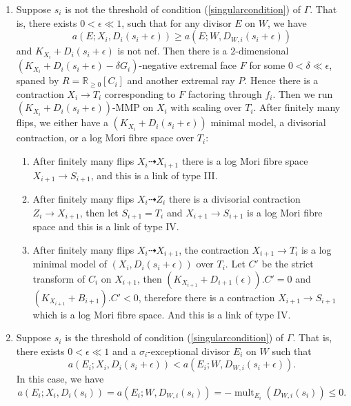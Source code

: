 \documentclass[11pt]{amsart}
\begin{document}
\begin{enumerate}
  \item\label{2a} Suppose $s_{i}$ is not the threshold of  condition (\ref{singularcondition}) of $\Gamma$. That is, there exists $0<\epsilon\ll 1$, such that for any divisor $E$ on $W$, we have
    \[
      a(E;X_{i},D_{i}(s_{i}+\epsilon))\geqslant a(E;W,D_{W,i}(s_{i}+\epsilon))
    \]
    and $K_{X_{i}}+D_{i}(s_{i}+\epsilon)$ is not nef. Then there is a $2$-dimensional $(K_{X_{i}}+D_{i}(s_{i}+\epsilon)-\delta G_{i})$-negative extremal face $F$ for some $0< \delta \ll \epsilon $, spaned by $R=\mathbb{R}_{\geqslant 0}[C_{i}]$ and another extremal ray $P$. Hence there is a contraction $X_{i}\to T_{i}$ corresponding to $F$ factoring through $f_{i}$. Then we run $(K_{X_{i}}+D_{i}(s_{i}+\epsilon))$-MMP on $X_{i}$ with scaling over $T_{i}$. After finitely many flips, we either have a $(K_{X_{i}}+D_{i}(s_{i}+\epsilon))$ minimal model, a divisorial contraction, or a log Mori fibre space over $T_{i}$: 
    \begin{enumerate}
    \item\label{2a1}After finitely many flips $X_{i}\dashrightarrow X_{i+1}$ there is a log Mori fibre space $X_{i+1}\to S_{i+1}$, and this is a link of type III.
    \item\label{2a2} After finitely many flips $X_{i}\dashrightarrow Z_{i}$ there is a divisorial contraction $Z_{i}\to X_{i+1}$, then let $S_{i+1}=T_{i}$ and $X_{i+1}\to S_{i+1}$ is a log Mori fibre space and this is a link of type IV.
    \item \label{2a3}After finitely many flips $X_{i}\dashrightarrow X_{i+1}$,  the contraction $X_{i+1}\to T_{i}$ is a log minimal model of $\left(X_{i},D_{i}\left(s_{i}+\epsilon\right)\right)$ over $T_{i}$. Let  $C'$ be the strict transform of  $C_{i}$ on $X_{i+1}$, then $(K_{X_{i+1}}+D_{i+1}(\epsilon)).C'=0$ and $(K_{X_{i+1}}+B_{i+1}).C'<0$, therefore there is a contraction  $X_{i+1} \to S_{i+1}$ which is a log Mori fibre space. And this is a link of type IV. 
  \end{enumerate}
\item\label{2b} Suppose $s_{i}$ is the threshold of condition (\ref{singularcondition}) of $\Gamma$. That is, there exists  $0<\epsilon \ll 1$ and a $\sigma_{i}$-exceptional divisor $E_{i}$ on $W$ such that 
    \[
      a(E_{i};X_{i},D_{i}(s_{i}+\epsilon))< a(E_{i};W,D_{W,i}(s_{i}+\epsilon))
    .\]
   In this case, we have 
    \[
  a(E_{i};X_{i},D_{i}(s_{i}))= a(E_{i};W,D_{W,i}(s_{i}))=-\operatorname{mult}_{E_{i}}(D_{W,i}(s_{i}))\leqslant 0
    .\]


\end{enumerate}
\end{document}
